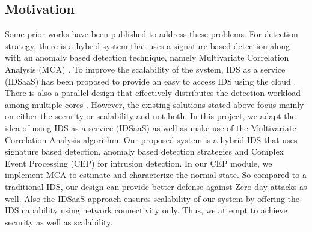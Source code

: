 \documentclass[conference]{sig-alternate-05-2015}
\begin{document}
\subsection{Motivation}\label{subsec:motivation}
Some prior works have been published to address these problems. For detection strategy, there is a hybrid system that uses a signature-based detection along with an anomaly based detection technique, namely Multivariate Correlation Analysis (MCA) \cite{MCA}. To improve the scalability of the system, IDS as a service (IDSaaS) has been proposed to provide an easy to access IDS using the cloud \cite{IDSaaS}. There is also a parallel design that effectively distributes the detection workload among multiple cores \cite{multicore}. However, the existing solutions stated above focus mainly on either the security or scalability and not both. In this project, we adapt the idea of using IDS as a service (IDSaaS) as well as make use of the Multivariate Correlation Analysis algorithm. Our proposed system is a hybrid IDS that uses signature based detection, anomaly based detection strategies and Complex Event Processing (CEP) for intrusion detection. In our CEP module, we implement MCA to estimate and characterize the normal state. So compared to a traditional IDS, our design can provide better defense against Zero day attacks as well. Also the IDSaaS approach ensures scalability of our system by offering the IDS capability using network connectivity only. Thus, we attempt to achieve security as well as scalability.
\end{document}
